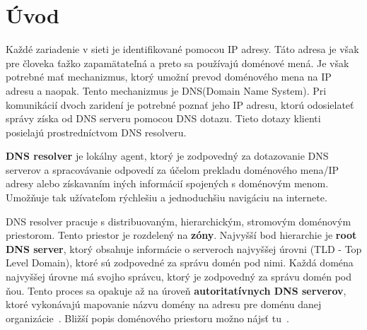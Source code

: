
\chapter{Úvod}
Každé zariadenie v sieti je identifikované pomocou IP adresy. Táto adresa je však pre človeka ťažko zapamätateľná a preto sa používajú doménové mená. Je však potrebné mať mechanizmus, ktorý umožní prevod doménového mena na IP adresu a naopak. Tento mechanizmus je DNS(Domain Name System). Pri komunikácií dvoch zaridení je potrebné poznať jeho IP adresu, ktorú odosielateť správy získa od DNS serveru pomocou DNS dotazu. Tieto dotazy klienti posielajú prostredníctvom DNS resolveru.

\textbf{DNS resolver} je lokálny agent, ktorý je zodpovedný za dotazovanie DNS serverov a spracovávanie odpovedí za účelom prekladu doménového mena/IP adresy alebo získavaním iných informácií spojených s doménovým menom. Umožňuje tak užívateľom rýchlešiu a jednoduchšiu navigáciu na internete.~\cite{RFC1035}

DNS resolver pracuje s distribuovaným, hierarchickým, stromovým doménovým priestorom. Tento priestor je rozdelený na \textbf{zóny}. Najvyšší bod hierarchie je \textbf{root DNS server}, ktorý obsahuje informácie o serveroch najvyššej úrovni (TLD - Top Level Domain), ktoré sú zodpovedné za správu domén pod nimi. Každá doména najvyššej úrovne má svojho správcu, ktorý je zodpovedný za správu domén pod ňou. Tento proces sa opakuje až na úroveň \textbf{autoritatívnych DNS serverov}, ktoré vykonávajú mapovanie názvu domény na adresu pre doménu danej organizácie~\cite{enwiki:1182387275}. Bližší popis doménového priestoru možno nájsť tu~\cite{RFC1034}.

